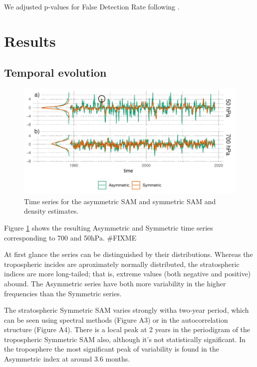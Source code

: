 \documentclass[]{ametsocV5}
\begin{document}
We adjusted p-values for False Detection Rate following
\citet{wilks2016}.

\section{Results}

\subsection{Temporal evolution}

\begin{figure}
\includegraphics{asymsam-timeseries-1} \caption[Time series for the asymmetric SAM and symmetric SAM and density estimates]{Time series for the asymmetric SAM and symmetric SAM and density estimates.}\label{fig:asymsam-timeseries}
\end{figure}

Figure \ref{fig:asymsam-timeseries} shows the resulting Asymmetric and
Symmetric time series corresponding to 700 and 50hPa. \#FIXME

At first glance the series can be distinguished by their distributions.
Whereas the tropospheric incides are aproximately normally distributed,
the stratospheric indices are more long-tailed; that is, extreme values
(both negative and positive) abound. The Asymmetric series have both
more variability in the higher frequencies than the Symmetric series.

The stratospheric Symmetric SAM varies strongly witha two-year period,
which can be seen using spectral methods (Figure A3) or in the
autocorrelation structure (Figure A4). There is a local peak at 2 years
in the periodigram of the tropospheric Symmetric SAM also, although it's
not statistically significant. In the troposphere the most significant
peak of variability is found in the Asymmetric index at around 3.6
months.
\end{document}
